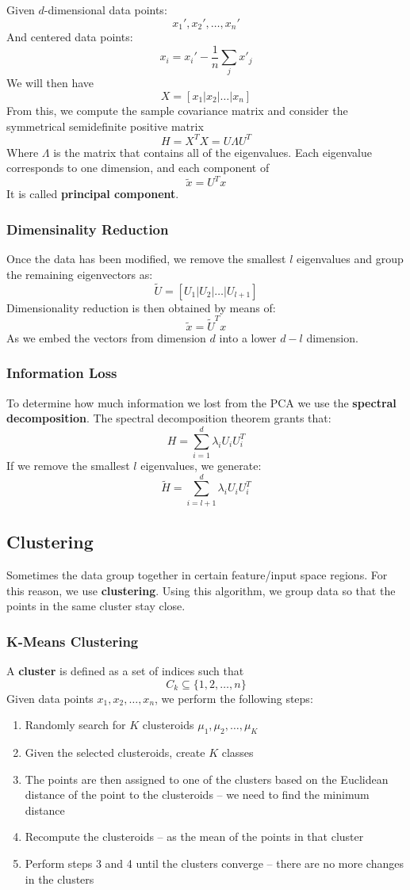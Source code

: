 \documentclass{article}
\begin{document}
Given $d$-dimensional data points:
\[ x_1', x_2', \dots, x_n' \]
And centered data points:
\[ x_i = x_i' - \frac{1}{n} \sum_j x'_j \]
We will then have
\[ X = [x_1 | x_2 | \dots | x_n] \]
From this, we compute the sample covariance matrix and consider the symmetrical semidefinite positive matrix
\[ H = X^TX = U\Lambda U^T \]
Where $\Lambda$ is the matrix that contains all of the eigenvalues. Each eigenvalue corresponds to one dimension, and each component of
\[ \tilde x = U^Tx \]
It is called \textbf{principal component}.

\subsubsection{Dimensinality Reduction}
Once the data has been modified, we remove the smallest $l$ eigenvalues and group the remaining eigenvectors as:
\[ \tilde U = [ U_1 | U_2 | \dots | U_{l+1} ] \]
Dimensionality reduction is then obtained by means of:
\[ \tilde x = \tilde U^T x \]
As we embed the vectors from dimension $d$ into a lower $d-l$ dimension.

\subsubsection{Information Loss}
To determine how much information we lost from the PCA we use the \textbf{spectral decomposition}. The spectral decomposition theorem grants that:
\[ H = \sum^d_{i=1} \lambda_iU_iU_i^T \]
If we remove the smallest $l$ eigenvalues, we generate:
\[ \tilde H = \sum^d_{i = l+1} \lambda_iU_iU_i^T \]

\subsection{Clustering}
Sometimes the data group together in certain feature/input space regions. For this reason, we use \textbf{clustering}. Using this algorithm, we group data so that the points in the same cluster stay close.

\subsubsection{K-Means Clustering}
A \textbf{cluster} is defined as a set of indices such that
\[ C_k \subseteq \{ 1, 2, \dots, n \} \]
Given data points $x_1, x_2, \dots, x_n$, we perform the following steps:

\begin{enumerate}
	\item Randomly search for $K$ clusteroids $\mu_1, \mu_2, \dots, \mu_K$
	\item Given the selected clusteroids, create $K$ classes
	\item The points are then assigned to one of the clusters based on the Euclidean distance of the point to the clusteroids -- we need to find the minimum distance
	\item Recompute the clusteroids -- as the mean of the points in that cluster
	\item Perform steps 3 and 4 until the clusters converge -- there are no more changes in the clusters
\end{enumerate}
\end{document}
